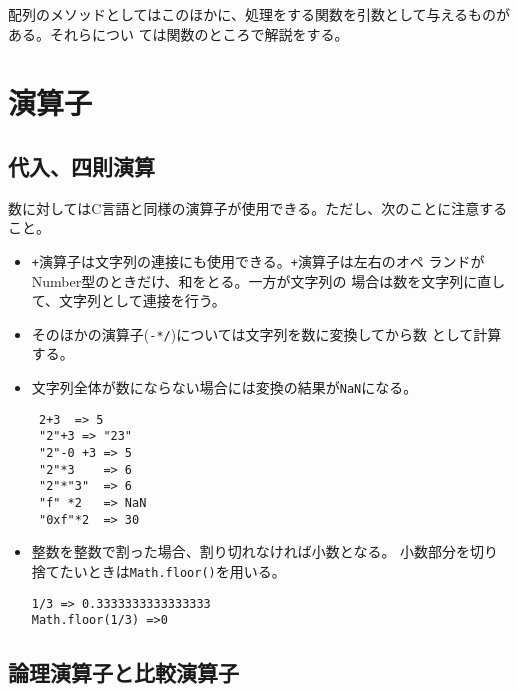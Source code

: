 配列のメソッドとしてはこのほかに、処理をする関数を引数として与えるものがある。それらについ
ては関数のところで解説をする。

\section{演算子}\label{operator}
\subsection{代入、四則演算}
数に対してはC言語と同様の演算子が使用できる。ただし、次のことに注意する
こと。
\begin{itemize}
 \item \Verb-+-演算子は文字列の連接にも使用できる。\Verb-+-演算子は左右のオペ
ランドがNumber型のときだけ、和をとる。一方が文字列の
場合は数を文字列に直して、文字列として連接を行う。
 \item そのほかの演算子(\Verb+-*/+)については文字列を数に変換してから数
       として計算する。
 \item 文字列全体が数にならない場合には変換の結果が\Verb+NaN+になる。
\begin{Verbatim}
 2+3  => 5
 "2"+3 => "23"
 "2"-0 +3 => 5
 "2"*3    => 6
 "2"*"3"  => 6
 "f" *2   => NaN
 "0xf"*2  => 30
\end{Verbatim}
 \item 整数を整数で割った場合、割り切れなければ小数となる。
       小数部分を切り捨てたいときは\Verb+Math.floor()+を用いる。
\begin{Verbatim}
1/3 => 0.3333333333333333
Math.floor(1/3) =>0
\end{Verbatim}
\end{itemize}

\subsection{論理演算子と比較演算子}
